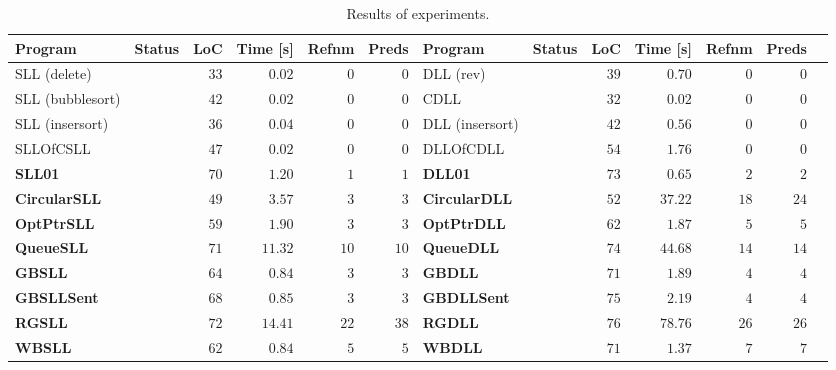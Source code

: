 {\begin{table}[t]
	\centering
	\scriptsize
	\caption{Results of experiments.}
	\begin{tabular}{| l | l | r | r | r | r || l | l | r | r | r | r | r |}
        \hline
		Program & Status & LoC & Time [s] & Refnm& Preds & Program & Status & LoC & Time [s] & Refnm & Preds \\
        \hline
        \hline
		SLL (delete) & \safe & $33$ & $0.02$ &  $0$ & $0$ & DLL (rev) & \safe & $39$ &  $0.70$ & $0$  & $0$ \\
        \hline
		SLL (bubblesort) & \safe & $42$ & $0.02$ &  $0$ & $0$ & CDLL & \safe & $32$ &  $0.02$  & $0$  & $0$ \\
        \hline
		SLL (insersort) & \safe & $36$ & $0.04$ & $0$ & $0$ & DLL (insersort) & \safe & $42$ &  $0.56$  & $0$  & $0$ \\
        \hline
		SLLOfCSLL & \safe & $47$ & $0.02$ & $0$ & $0$ & DLLOfCDLL & \safe & $54$ &  $1.76$  & $0$  & $0$ \\
        \hline
		\rowcolor{rowgray}
		\textbf{SLL01}    & \safe & $70$ & $1.20$   &  $1$ & $1$ & \textbf{DLL01} & \safe & $73$ &  $0.65$  & $2$  & $2$ \\
        \hline
		\rowcolor{rowgray}
		\textbf{CircularSLL} & \safe & $49$ & $3.57$   &  $3$  & $3$ & \textbf{CircularDLL} & \safe  & $52$ &  $37.22$ & $18$ & $24$ \\
        \hline
		\rowcolor{rowgray}
		\textbf{OptPtrSLL}   & \safe & $59$ & $1.90$ & $3$ & $3$ & \textbf{OptPtrDLL} & \safe & $62$ &  $1.87$  & $5$ & $5$ \\
        \hline
		\rowcolor{rowgray}
		\textbf{QueueSLL}    & \safe & $71$ & $11.32$  &  $10$ & $10$ & \textbf{QueueDLL} & \safe  & $74$ &  $44.68$ & $14$ & $14$ \\
		\rowcolor{rowgray}
        \hline
		\textbf{GBSLL}       & \safe & $64$ & $0.84$   &  $3$ & $3$ & \textbf{GBDLL} & \safe & $71$ &  $1.89$  & $4$ & $4$ \\
        \hline
		\rowcolor{rowgray}
		\textbf{GBSLLSent}   & \safe  & $68$ & $0.85$   &  $3$ & $3$ & \textbf{GBDLLSent} & \safe & $75$ &  $2.19$  & $4$ & $4$ \\
        \hline
		\rowcolor{rowgray}
		\textbf{RGSLL}       & \safe & $72$ & $14.41$  &  $22$  & $38$ & \textbf{RGDLL} & \safe & $76$ &  $78.76$ & $26$ & $26$ \\
        \hline
		\rowcolor{rowgray}
		\textbf{WBSLL}       & \safe & $62$ & $0.84$   &  $5$  & $5$ & \textbf{WBDLL} & \safe & $71$ &  $1.37$  & $7$ & $7$ \\

\end{tabular}
\end{table}}

